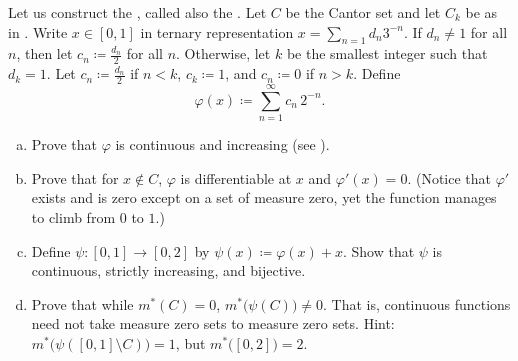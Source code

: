 \begin{samepage}
\begin{exercise}[Challenging]
Let us construct the \emph{}, called also the 
\emph{}.  Let $C$ be the Cantor set and
let $C_k$ be as in .
Write $x \in [0,1]$ in ternary representation $x = \sum_{n=1} d_n 3^{-n}$.
If $d_n \neq 1$ for all $n$, then let $c_n \coloneqq \frac{d_n}{2}$ for all $n$.
Otherwise, let $k$ be the smallest integer such that $d_k = 1$.
Let $c_n \coloneqq \frac{d_n}{2}$ if $n < k$, $c_k \coloneqq 1$, and $c_n
\coloneqq 0$ if $n > k$.
Define
\begin{equation*}
\varphi(x) \coloneqq \sum_{n=1}^\infty c_n \, 2^{-n} .
\end{equation*}
\begin{enumerate}[a)]
\item
Prove that $\varphi$ is continuous and increasing (see
).
\item
Prove that for $x \notin C$, $\varphi$ is differentiable at $x$ and
$\varphi'(x) = 0$.
(Notice that $\varphi'$ exists and is zero except on a set of measure zero,
yet the function manages to climb from $0$ to $1$.)
\item
Define $\psi \colon [0,1] \to [0,2]$ by
$\psi(x) \coloneqq \varphi(x) + x$.
Show that $\psi$ is continuous, strictly increasing, and bijective.
\item
Prove that while $m^*(C) = 0$, $m^*\bigl(\psi(C)\bigr) \neq 0$.  That is,
continuous functions need not take measure zero sets to measure zero sets.
Hint: $m^*\bigl(\psi([0,1] \setminus C)\bigr) = 1$, but
$m^*\bigl([0,2]\bigr) = 2$.
\end{enumerate}
\end{exercise}
\end{samepage}

\begin{myfigureht}
\caption{Cantor function or Devil's staircase (the function $\varphi$ from
the exercise).\label{fig:cantorfunction}}
\end{myfigureht}

